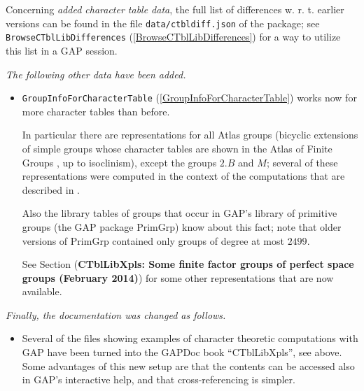 \documentclass[a4paper,11pt]{report}
\begin{document}
{{{ Concerning \emph{added character table data}, the full list of differences w. r. t. earlier versions can be found in the
file \texttt{data/ctbldiff.json} of the package; see \texttt{BrowseCTblLibDifferences} (\ref{BrowseCTblLibDifferences}) for a way to utilize this list in a \textsf{GAP} session. 

 \emph{The following other data have been added.} 

 
\begin{itemize}
\item  \texttt{GroupInfoForCharacterTable} (\ref{GroupInfoForCharacterTable}) works now for more character tables than before. 

 In particular there are representations for all \textsf{Atlas} groups (bicyclic extensions of simple groups whose character tables are shown
in the \textsf{Atlas} of Finite Groups \cite{CCN85}, up to isoclinism), except the groups $2.B$ and $M$; several of these representations were computed in the context of the
computations that are described in \cite{BMO17}. 

 Also the library tables of groups that occur in \textsf{GAP}'s library of primitive groups (the \textsf{GAP} package \textsf{PrimGrp}) know about this fact; note that older versions of \textsf{PrimGrp} contained only groups of degree at most $2499$. 

 See Section  (\textbf{CTblLibXpls: Some finite factor groups of perfect space groups (February 2014)}) for some other representations that are now available. 
\end{itemize}
 

 \emph{Finally, the documentation was changed as follows.} 

 
\begin{itemize}
\item  Several of the files showing examples of character theoretic computations with \textsf{GAP} have been turned into the \textsf{GAPDoc} book ``CTblLibXpls'', see above.  Some advantages of this new setup are that the contents can be accessed also
in \textsf{GAP}'s interactive help, and that cross-referencing is simpler. 
\end{itemize}
 }

  
}}
\end{document}
